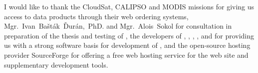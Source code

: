 I would like to thank the CloudSat, CALIPSO and MODIS missions for giving us
access to
data products through their web ordering systems,  \mbox{Mgr. Ivan Bašták Ďurán,
PhD.} and \mbox{Mgr. Alois Sokol} for consultation in preparation of the thesis
and testing of \ccplot, the
developers of , , ,
, and  for providing us
with a strong software basis for development of \ccplot, and the open-source
hosting provider SourceForge for offering a free web hosting service for the
\ccplot web site and supplementary development tools.